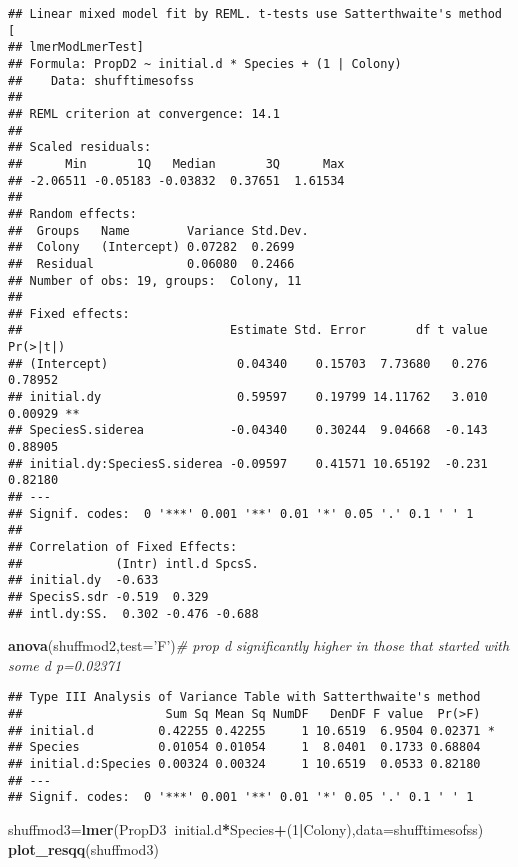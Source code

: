 \documentclass[]{article}
\newenvironment{Shaded}{\begin{snugshade}}{\end{snugshade}}
\newcommand{\CommentTok}[1]{\textcolor[rgb]{0.56,0.35,0.01}{\textit{#1}}}
\newcommand{\DataTypeTok}[1]{\textcolor[rgb]{0.13,0.29,0.53}{#1}}
\newcommand{\DecValTok}[1]{\textcolor[rgb]{0.00,0.00,0.81}{#1}}
\newcommand{\KeywordTok}[1]{\textcolor[rgb]{0.13,0.29,0.53}{\textbf{#1}}}
\newcommand{\NormalTok}[1]{#1}
\newcommand{\OperatorTok}[1]{\textcolor[rgb]{0.81,0.36,0.00}{\textbf{#1}}}
\newcommand{\StringTok}[1]{\textcolor[rgb]{0.31,0.60,0.02}{#1}}
\begin{document}
\begin{verbatim}
## Linear mixed model fit by REML. t-tests use Satterthwaite's method [
## lmerModLmerTest]
## Formula: PropD2 ~ initial.d * Species + (1 | Colony)
##    Data: shufftimesofss
## 
## REML criterion at convergence: 14.1
## 
## Scaled residuals: 
##      Min       1Q   Median       3Q      Max 
## -2.06511 -0.05183 -0.03832  0.37651  1.61534 
## 
## Random effects:
##  Groups   Name        Variance Std.Dev.
##  Colony   (Intercept) 0.07282  0.2699  
##  Residual             0.06080  0.2466  
## Number of obs: 19, groups:  Colony, 11
## 
## Fixed effects:
##                             Estimate Std. Error       df t value Pr(>|t|)   
## (Intercept)                  0.04340    0.15703  7.73680   0.276  0.78952   
## initial.dy                   0.59597    0.19799 14.11762   3.010  0.00929 **
## SpeciesS.siderea            -0.04340    0.30244  9.04668  -0.143  0.88905   
## initial.dy:SpeciesS.siderea -0.09597    0.41571 10.65192  -0.231  0.82180   
## ---
## Signif. codes:  0 '***' 0.001 '**' 0.01 '*' 0.05 '.' 0.1 ' ' 1
## 
## Correlation of Fixed Effects:
##             (Intr) intl.d SpcsS.
## initial.dy  -0.633              
## SpecisS.sdr -0.519  0.329       
## intl.dy:SS.  0.302 -0.476 -0.688
\end{verbatim}

\begin{Shaded}
\begin{Highlighting}[]
\KeywordTok{anova}\NormalTok{(shuffmod2,}\DataTypeTok{test=}\StringTok{'F'}\NormalTok{)}\CommentTok{# prop d significantly higher in those that started with some d p=0.02371}
\end{Highlighting}
\end{Shaded}

\begin{verbatim}
## Type III Analysis of Variance Table with Satterthwaite's method
##                    Sum Sq Mean Sq NumDF   DenDF F value  Pr(>F)  
## initial.d         0.42255 0.42255     1 10.6519  6.9504 0.02371 *
## Species           0.01054 0.01054     1  8.0401  0.1733 0.68804  
## initial.d:Species 0.00324 0.00324     1 10.6519  0.0533 0.82180  
## ---
## Signif. codes:  0 '***' 0.001 '**' 0.01 '*' 0.05 '.' 0.1 ' ' 1
\end{verbatim}

\begin{Shaded}
\begin{Highlighting}[]
\NormalTok{shuffmod3=}\KeywordTok{lmer}\NormalTok{(PropD3}\OperatorTok{~}\NormalTok{initial.d}\OperatorTok{*}\NormalTok{Species}\OperatorTok{+}\NormalTok{(}\DecValTok{1}\OperatorTok{|}\NormalTok{Colony),}\DataTypeTok{data=}\NormalTok{shufftimesofss)}
\KeywordTok{plot_resqq}\NormalTok{(shuffmod3)}
\end{Highlighting}
\end{Shaded}
\end{document}
